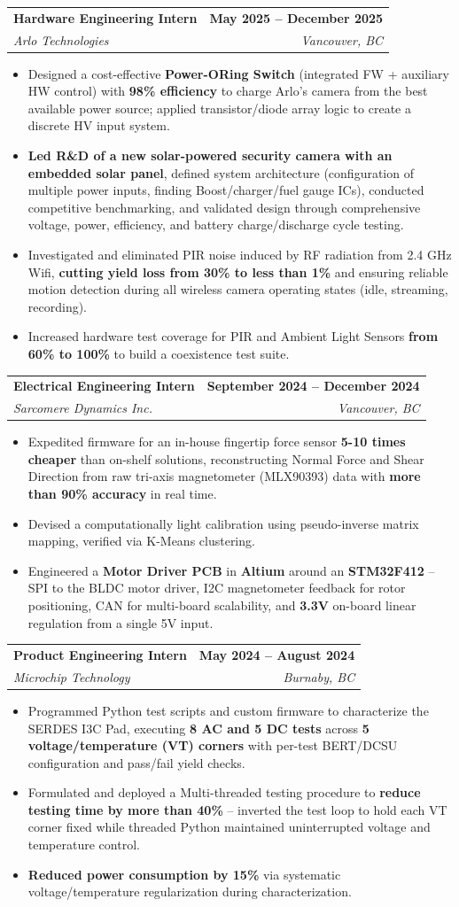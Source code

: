 \documentclass[letterpaper,10pt]{article}
\makeatletter
\newcommand{\resumeItem}[1]{
  \item\small{
    {#1 \vspace{-2pt}}
  }
}
\newcommand{\resumeSubheading}[4]{
  \vspace{-2pt}\item
    \begin{tabular*}{0.97\textwidth}[t]{l@{\extracolsep{\fill}}r}
      \textbf{#1} & \textbf{#2} \\
      \textit{\small#3} & \textit{\small #4} \\
    \end{tabular*}\vspace{-7pt}
}
\newcommand{\resumeItemListStart}{\begin{itemize}}
\newcommand{\resumeItemListEnd}{\end{itemize}\vspace{-5pt}}
\makeatother
\begin{document}
    \resumeSubheading
      {Hardware Engineering Intern}{May 2025 -- December 2025}
      {Arlo Technologies}{Vancouver, BC}
      \resumeItemListStart
        \resumeItem{Designed a cost-effective \textbf{Power-ORing Switch} (integrated FW + auxiliary HW control) with \textbf{98\% efficiency} to charge Arlo's camera from the best available power source; applied transistor/diode array logic to create a discrete HV input system.}
        \resumeItem{\textbf{Led R\&D of a new solar-powered security camera with an embedded solar panel}, defined system architecture (configuration of multiple power inputs, finding Boost/charger/fuel gauge ICs), conducted competitive benchmarking, and validated design through comprehensive voltage, power, efficiency, and battery charge/discharge cycle testing.}
        \resumeItem{Investigated and eliminated PIR noise induced by RF radiation from 2.4 GHz Wifi, \textbf{cutting yield loss from 30\% to less than 1\%} and ensuring reliable motion detection during all wireless camera operating states (idle, streaming, recording).}
        \resumeItem{Increased hardware test coverage for PIR and Ambient Light Sensors \textbf{from 60\% to 100\%} to build a coexistence test suite.}
      \resumeItemListEnd

    \resumeSubheading
      {Electrical Engineering Intern}{September 2024 -- December 2024}
      {Sarcomere Dynamics Inc.}{Vancouver, BC}
      \resumeItemListStart
        \resumeItem{Expedited firmware for an in-house fingertip force sensor \textbf{5-10 times cheaper} than on-shelf solutions, reconstructing Normal Force and Shear Direction from raw tri-axis magnetometer (MLX90393) data with \textbf{more than 90\% accuracy} in real time.}
        \resumeItem{Devised a computationally light calibration using pseudo-inverse matrix mapping, verified via K-Means clustering.}
        \resumeItem{Engineered a \textbf{Motor Driver PCB} in \textbf{Altium} around an \textbf{STM32F412} -- SPI to the BLDC motor driver, I2C magnetometer feedback for rotor positioning, CAN for multi-board scalability, and \textbf{3.3V} on-board linear regulation from a single 5V input.}
      \resumeItemListEnd

    \resumeSubheading
      {Product Engineering Intern}{May 2024 -- August 2024}
      {Microchip Technology}{Burnaby, BC}
      \resumeItemListStart
        \resumeItem{Programmed Python test scripts and custom firmware to characterize the SERDES I3C Pad, executing \textbf{8 AC and 5 DC tests} across \textbf{5 voltage/temperature (VT) corners} with per-test BERT/DCSU configuration and pass/fail yield checks.}
        \resumeItem{Formulated and deployed a Multi-threaded testing procedure to \textbf{reduce testing time by more than 40\%} -- inverted the test loop to hold each VT corner fixed while threaded Python maintained uninterrupted voltage and temperature control.}
        \resumeItem{\textbf{Reduced power consumption by 15\%} via systematic voltage/temperature regularization during characterization.}
      \resumeItemListEnd
\end{document}

